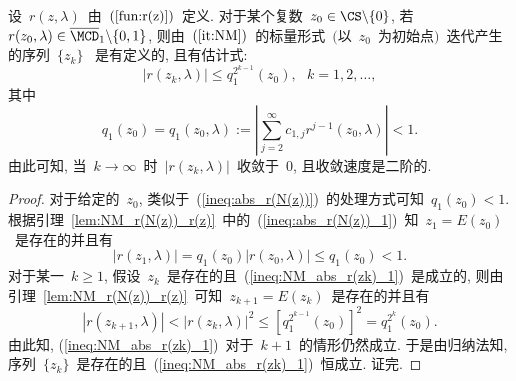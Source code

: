 \begin{lemma}
\label{lem:NM_r(z)_convergence1} %

设~$r(z,\lambda)$~由~$(\ref{fun:r(z)})$~定义. 对于某个复数~$z_0 \in
\CS\backslash\{0\}$, 若~$r(z_0,\lambda) \in
\overline{\MCD}_1\backslash\{0,1\}$,
则由~$(\ref{it:NM})$~的标量形式~$($以~$z_0$~为初始点$)$~迭代产生的序列~$\{z_k\}$~
是有定义的, 且有估计式:
\begin{equation}
\label{ineq:NM_abs_r(zk)_1} |r(z_k,\lambda)| \leq
q_1^{2^{k-1}}(z_0), \ \ \ k = 1, 2, \ldots,
\end{equation}
其中
\begin{equation}
\label{cons:NM_q1(z0)} q_1(z_0) = q_1(z_0,\lambda) :=
\left|\sum_{j=2}^\infty c_{1,j} r^{j-1}(z_0,\lambda)\right| < 1.
\end{equation}
由此可知, 当~$k \to \infty$~时~$|r(z_k,\lambda)|$~收敛于~0,
且收敛速度是二阶的.
\end{lemma}

\begin{proof}

对于给定的~$z_0$,
类似于~(\ref{ineq:abs_r(N(z))})~的处理方式可知~$q_1(z_0) < 1$.
根据引理~\ref{lem:NM_r(N(z))_r(z)}~中的~(\ref{ineq:abs_r(N(z))_1})~知~$z_1
= E(z_0)$~是存在的并且有
$$
|r(z_1,\lambda)| = q_1(z_0)|r(z_0,\lambda)| \leq q_1(z_0) < 1.
$$
对于某一~$k \geq 1$,
假设~$z_k$~是存在的且~(\ref{ineq:NM_abs_r(zk)_1})~是成立的,
则由引理~\ref{lem:NM_r(N(z))_r(z)}~可知~$z_{k+1} =
E(z_k)$~是存在的并且有
\begin{equation*}
|r(z_{k+1},\lambda)| < |r(z_{k},\lambda)|^2 \leq
\left[q_1^{2^{k-1}}(z_0)\right]^2 = q_1^{2^{k}}(z_0).
\end{equation*}
由此知, (\ref{ineq:NM_abs_r(zk)_1})~对于~$k+1$~的情形仍然成立.
于是由归纳法知,
序列~$\{z_k\}$~是存在的且~(\ref{ineq:NM_abs_r(zk)_1})~恒成立. 证完.
\end{proof}



